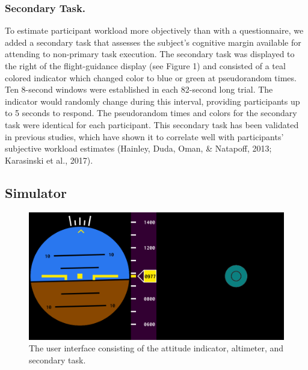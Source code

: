 \subsubsection{Secondary Task.}
To estimate participant workload more objectively than with a questionnaire, we added a secondary task that assesses the subject's cognitive margin available for attending to non-primary task execution.
The secondary task was displayed to the right of the flight-guidance display (see Figure 1) and consisted of a teal colored indicator which changed color to blue or green at pseudorandom times.
Ten 8-second windows were established in each 82-second long trial.
The indicator would randomly change during this interval, providing participants up to 5 seconds to respond.
The pseudorandom times and colors for the secondary task were identical for each participant.
This secondary task has been validated in previous studies, which have shown it to correlate well with participants' subjective workload estimates (Hainley, Duda, Oman, \& Natapoff, 2013; Karasinski et al., 2017).

\subsection{Simulator}

\begin{figure}[b!]
    \begin{center}
        \includegraphics[width=0.8\linewidth]{figures/image1.png}
        \caption{The user interface consisting of the attitude indicator, altimeter, and secondary task.}
    \end{center}
\end{figure}

